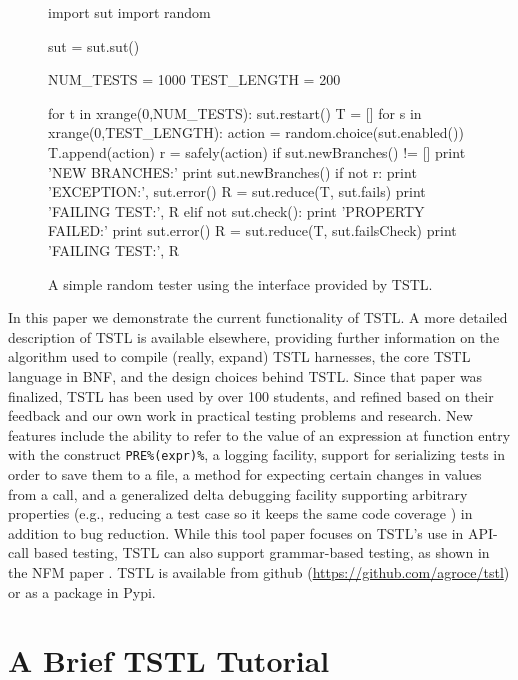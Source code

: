 \documentclass{sig-alternate}
\begin{document}
\begin{figure}
\begin{code}
import sut
import random

sut = sut.sut()

NUM\_TESTS = 1000
TEST\_LENGTH = 200 

for t in xrange(0,NUM\_TESTS):
   sut.restart()
   T = []
   for s in xrange(0,TEST\_LENGTH): 
       action = random.choice(sut.enabled())
       T.append(action)
       r = safely(action)
       if sut.newBranches() != []
          print 'NEW BRANCHES:'
          print sut.newBranches()
       if not r:
          print 'EXCEPTION:', sut.error() 
          R = sut.reduce(T, sut.fails) 
          print 'FAILING TEST:', R
       elif not sut.check():
          print 'PROPERTY FAILED:'
          print sut.error()  
          R = sut.reduce(T, sut.failsCheck) 
          print 'FAILING TEST:', R
\end{code}
\caption{A simple random tester using the interface provided by TSTL.}
\label{fig:rt}
\end{figure}

In this paper we demonstrate the current functionality of TSTL.  A
more detailed description of TSTL \cite{NFM15} is available elsewhere,
providing further information on the algorithm used to compile
(really, expand) TSTL harnesses, the core TSTL language in BNF, and
the design choices behind TSTL.  Since that paper was finalized, TSTL
has been used by over 100 students, and refined based on their
feedback and our own work in practical testing problems and research.
New features include the ability to refer to the value of an
expression at function entry with the construct {\tt PRE\%(expr)\%}, a
logging facility, support for serializing tests in order to save them
to a file, a method for expecting certain changes in values from a
call, and a generalized delta debugging \cite{DD} facility supporting
arbitrary properties (e.g., reducing a test case so it keeps the same
code coverage \cite{icst2014}) in addition to bug reduction.  While
this tool paper focuses on TSTL's use in API-call based testing, TSTL
can also support grammar-based testing, as shown in the NFM paper
\cite{NFM15}.  TSTL is available from github
(\url{https://github.com/agroce/tstl}) or as a package in Pypi.

\section{A Brief TSTL Tutorial}
\end{document}
